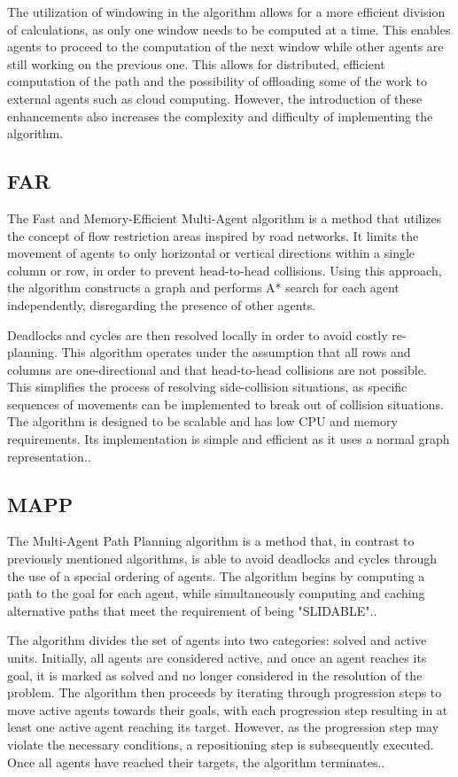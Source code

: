 The utilization of windowing in the algorithm allows for a more efficient division of calculations, as only one window needs to be computed at a time. This enables agents to proceed to the computation of the next window while other agents are still working on the previous one. This allows for distributed, efficient computation of the path and the possibility of offloading some of the work to external agents such as cloud computing. However, the introduction of these enhancements also increases the complexity and difficulty of implementing the algorithm.


\subsection{FAR}
The Fast and Memory-Efficient Multi-Agent algorithm is a method that utilizes the concept of flow restriction areas inspired by road networks. It limits the movement of agents to only horizontal or vertical directions within a single column or row, in order to prevent head-to-head collisions. Using this approach, the algorithm constructs a graph and performs A* search for each agent independently, disregarding the presence of other agents.

Deadlocks and cycles are then resolved locally in order to avoid costly re-planning. This algorithm operates under the assumption that all rows and columns are one-directional and that head-to-head collisions are not possible. This simplifies the process of resolving side-collision situations, as specific sequences of movements can be implemented to break out of collision situations. The algorithm is designed to be scalable and has low CPU and memory requirements. Its implementation is simple and efficient as it uses a normal graph representation.\cite{far}.

\subsection{MAPP}
The Multi-Agent Path Planning algorithm is a method that, in contrast to previously mentioned algorithms, is able to avoid deadlocks and cycles through the use of a special ordering of agents. The algorithm begins by computing a path to the goal for each agent, while simultaneously computing and caching alternative paths that meet the requirement of being "SLIDABLE".\cite{mapp_algo}. 

The algorithm divides the set of agents into two categories: solved and active units. Initially, all agents are considered active, and once an agent reaches its goal, it is marked as solved and no longer considered in the resolution of the problem. The algorithm then proceeds by iterating through progression steps to move active agents towards their goals, with each progression step resulting in at least one active agent reaching its target. However, as the progression step may violate the necessary conditions, a repositioning step is subsequently executed. Once all agents have reached their targets, the algorithm terminates.\cite{mapp_algo}.